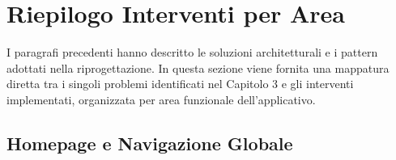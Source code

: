 \section{Riepilogo Interventi per Area}
\label{sec:riepilogo}

I paragrafi precedenti hanno descritto le soluzioni architetturali e i pattern adottati nella riprogettazione. In questa sezione viene fornita una mappatura diretta tra i singoli problemi identificati nel Capitolo 3 e gli interventi implementati, organizzata per area funzionale dell'applicativo.

\subsection{Homepage e Navigazione Globale}


